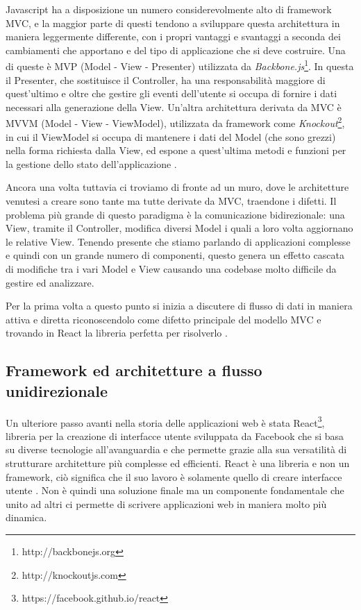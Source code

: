 Javascript ha a disposizione un numero considerevolmente alto di framework MVC, e la maggior parte di questi tendono a sviluppare questa architettura in maniera leggermente differente, con i propri vantaggi e svantaggi a seconda dei cambiamenti che apportano e del tipo di applicazione che si deve costruire.
Una di queste è MVP (Model - View - Presenter) utilizzata da \textit{Backbone.js}\footnote{http://backbonejs.org}. In questa il Presenter, che sostituisce il Controller, ha una responsabilità maggiore di quest'ultimo e oltre che gestire gli eventi dell'utente si occupa di fornire i dati necessari alla generazione della View. Un'altra architettura derivata da MVC è MVVM (Model - View - ViewModel), utilizzata da framework come \textit{Knockout}\footnote{http://knockoutjs.com}, in cui il ViewModel si occupa di mantenere i dati del Model (che sono grezzi) nella forma richiesta dalla View, ed espone a quest'ultima metodi e funzioni per la gestione dello stato dell'applicazione \cite{ChauhanFrontendArchitectures}.

Ancora una volta tuttavia ci troviamo di fronte ad un muro, dove le architetture venutesi a creare sono tante ma tutte derivate da MVC, traendone i difetti. Il problema più grande di questo paradigma è la comunicazione bidirezionale: una View, tramite il Controller, modifica diversi Model i quali a loro volta aggiornano le relative View. Tenendo presente che stiamo parlando di applicazioni complesse e quindi con un grande numero di componenti, questo genera un effetto cascata di modifiche tra i vari Model e View causando una codebase molto difficile da gestire ed analizzare. 

Per la prima volta a questo punto si inizia a discutere di flusso di dati in maniera attiva e diretta riconoscendolo come difetto principale del modello MVC e trovando in React la libreria perfetta per risolverlo \cite{SalihefendicFluxVsMVC}.

\subsection{Framework ed architetture a flusso unidirezionale}
Un ulteriore passo avanti nella storia delle applicazioni web è stata React\footnote{https://facebook.github.io/react}, libreria per la creazione di interfacce utente sviluppata da Facebook che si basa su diverse tecnologie all'avanguardia e che permette grazie alla sua versatilità di strutturare architetture più complesse ed efficienti.
React è una libreria e non un framework, ciò significa che il suo lavoro è solamente quello di creare interfacce utente \cite{BunaReactIsTheNewFrontend}. Non è quindi una soluzione finale ma un componente fondamentale che unito ad altri ci permette di scrivere applicazioni web in maniera molto più dinamica.

